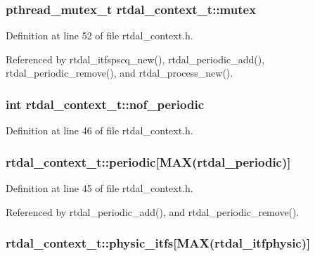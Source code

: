 \subsubsection[{mutex}]{\setlength{\rightskip}{0pt plus 5cm}pthread\-\_\-mutex\-\_\-t rtdal\-\_\-context\-\_\-t\-::mutex}\label{structrtdal__context__t_a3d973ad68e1ace5e912e2d0c5486be0d}


Definition at line 52 of file rtdal\-\_\-context.\-h.



Referenced by rtdal\-\_\-itfspscq\-\_\-new(), rtdal\-\_\-periodic\-\_\-add(), rtdal\-\_\-periodic\-\_\-remove(), and rtdal\-\_\-process\-\_\-new().

\subsubsection[{nof\-\_\-periodic}]{\setlength{\rightskip}{0pt plus 5cm}int rtdal\-\_\-context\-\_\-t\-::nof\-\_\-periodic}\label{structrtdal__context__t_a25c299df028c7b7b256ecd36b10b0c74}


Definition at line 46 of file rtdal\-\_\-context.\-h.

\subsubsection[{periodic}]{ rtdal\-\_\-context\-\_\-t\-::periodic[{\bf M\-A\-X}(rtdal\-\_\-periodic)]}\label{structrtdal__context__t_afdf9752c171c9dca028d37a8e92e02bc}


Definition at line 45 of file rtdal\-\_\-context.\-h.



Referenced by rtdal\-\_\-periodic\-\_\-add(), and rtdal\-\_\-periodic\-\_\-remove().

\subsubsection[{physic\-\_\-itfs}]{ rtdal\-\_\-context\-\_\-t\-::physic\-\_\-itfs[{\bf M\-A\-X}(rtdal\-\_\-itfphysic)]}\label{structrtdal__context__t_a98f27c3f5224b9558e25106b4b0822e2}


